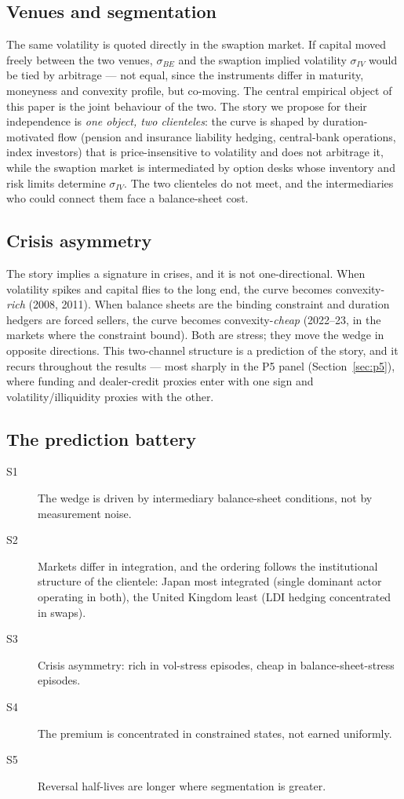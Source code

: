 \documentclass[11pt]{article}
\newcommand{\sBE}{\sigma_{BE}}
\newcommand{\sIV}{\sigma_{IV}}
\begin{document}
\subsection{Venues and segmentation}
The same volatility is quoted directly in the swaption market. If capital moved freely between the two
venues, $\sBE$ and the swaption implied volatility $\sIV$ would be tied by arbitrage --- not equal,
since the instruments differ in maturity, moneyness and convexity profile, but co-moving. The central
empirical object of this paper is the joint behaviour of the two. The story we propose for their
independence is \emph{one object, two clienteles}: the curve is shaped by duration-motivated flow
(pension and insurance liability hedging, central-bank operations, index investors) that is
price-insensitive to volatility and does not arbitrage it, while the swaption market is intermediated
by option desks whose inventory and risk limits determine $\sIV$. The two clienteles do not meet, and
the intermediaries who could connect them face a balance-sheet cost.

\subsection{Crisis asymmetry}
The story implies a signature in crises, and it is not one-directional. When volatility spikes and
capital flies to the long end, the curve becomes convexity-\emph{rich} (2008, 2011). When balance
sheets are the binding constraint and duration hedgers are forced sellers, the curve becomes
convexity-\emph{cheap} (2022--23, in the markets where the constraint bound). Both are stress; they
move the wedge in opposite directions. This two-channel structure is a prediction of the story, and it
recurs throughout the results --- most sharply in the P5 panel (Section~\ref{sec:p5}), where funding
and dealer-credit proxies enter with one sign and volatility/illiquidity proxies with the other.

\subsection{The prediction battery}\label{sec:battery}
\begin{description}
\item[S1] The wedge is driven by intermediary balance-sheet conditions, not by measurement noise.
\item[S2] Markets differ in integration, and the ordering follows the institutional structure of the
clientele: Japan most integrated (single dominant actor operating in both), the United Kingdom least
(LDI hedging concentrated in swaps).
\item[S3] Crisis asymmetry: rich in vol-stress episodes, cheap in balance-sheet-stress episodes.
\item[S4] The premium is concentrated in constrained states, not earned uniformly.
\item[S5] Reversal half-lives are longer where segmentation is greater.
\end{description}
\end{document}
